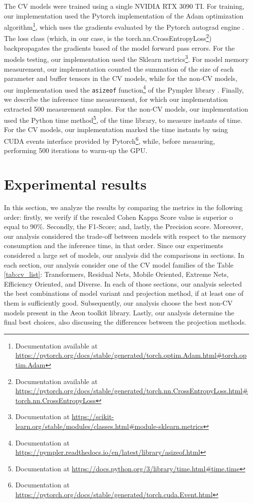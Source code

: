 The \gls{CV} models were trained using a single NVIDIA RTX 3090 TI. For training, our implementation used the Pytorch implementation of the Adam optimization algorithm\footnote{Documentation available at \url{https://pytorch.org/docs/stable/generated/torch.optim.Adam.html\#torch.optim.Adam}}, which uses the gradients evaluated by the Pytorch autograd engine \cite{Pytorch}. The loss class (which, in our case, is the torch.nn.CrossEntropyLoss\footnote{Documentation available at \url{https://pytorch.org/docs/stable/generated/torch.nn.CrossEntropyLoss.html\#torch.nn.CrossEntropyLoss}}) backpropagates the gradients based of the model forward pass errors. For the models testing, our implementation used the Sklearn \cite{Sklearn} metrics\footnote{Documentation at \url{https://scikit-learn.org/stable/modules/classes.html\#module-sklearn.metrics}}. For model memory measurement, our implementation counted the summation of the size of each parameter and buffer tensors in the \gls{CV} models, while for the non-\gls{CV} models, our implementation used the \texttt{asizeof} function\footnote{Documentation at \url{https://pympler.readthedocs.io/en/latest/library/asizeof.html}} of the Pympler library \cite{Pympler}. Finally, we describe the inference time measurement, for which our implementation extracted 500 measurement samples.  For the non-\gls{CV} models, our implementation used the Python time method\footnote{Documentation at \url{https://docs.python.org/3/library/time.html\#time.time}}, of the time library, to measure instants of time. For the \gls{CV} models, our implementation marked the time instants by using CUDA events interface provided by Pytorch\footnote{Documentation at \url{https://pytorch.org/docs/stable/generated/torch.cuda.Event.html}}, while, before measuring, performing 500 iterations to warm-up the GPU. 

\section{Experimental results}

In this section, we analyze the results by comparing the metrics in the following order: firstly, we verify if the rescaled Cohen Kappa Score value is superior o equal to 90\%. Secondly, the F1-Score; and, lastly, the Precision score. Moreover, our analysis considered the trade-off between models with respect to the memory consumption and the inference time, in that order. Since our experiments considered a large set of models, our analysis did the comparisons in sections. In each section, our analysis consider one of the \gls{CV} model families of the Table \ref{tab:cv_list}: Transformers, Residual Nets, Mobile Oriented, Extreme Nets, Efficiency Oriented, and Diverse. In each of those sections, our analysis selected the best combinations of model variant and projection method, if at least one of them is sufficiently good. Subsequently, our analysis choose the best non-\gls{CV} models present in the Aeon toolkit library. Lastly, our analysis determine the final best choices, also discussing the differences between the projection methods.


